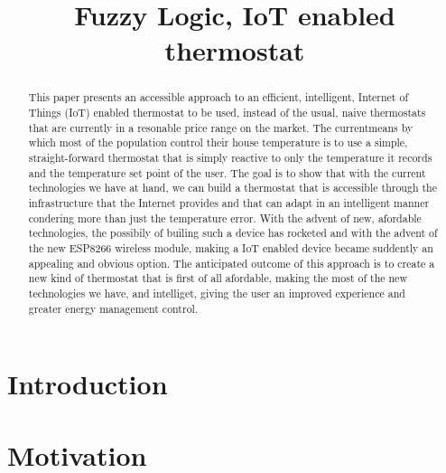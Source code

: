 \documentclass[conference]{IEEEtran}
\begin{document}
\title{Fuzzy Logic, IoT enabled thermostat}

\author{
}

\maketitle


\begin{abstract}

This paper presents an accessible approach to an efficient, intelligent, Internet of Things (IoT) enabled
thermostat to be used, instead of the usual, naive thermostats that are currently in a resonable price range
on the market. The currentmeans by which most of the population control their house temperature is to use a
simple, straight-forward thermostat that is simply reactive to only the temperature it records and the
temperature set point of the user. The goal is to show that with the current technologies we have at hand,
we can build a thermostat that is accessible through the infrastructure that the Internet provides and that
can adapt in an intelligent manner condering more than just the temperature error. With the advent of new,
afordable technologies, the possibily of builing such a device has rocketed and with the advent of the new
ESP8266 wireless module, making a IoT enabled device became suddently an appealing and obvious option. The
anticipated outcome of this approach is to create a new kind of thermostat that is first of all afordable,
making the most of the new technologies we have, and intelliget, giving the user an improved experience and
greater energy management control.

\end{abstract}


\section{Introduction}
\label{Introduction}



\section{Motivation}
\label{Motivation}
\end{document}
